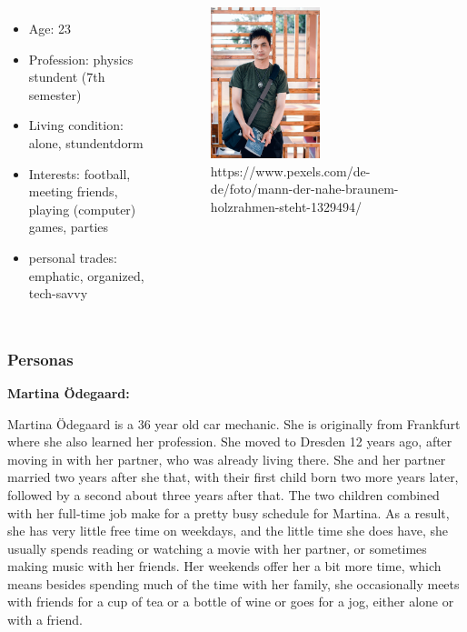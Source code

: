 \documentclass[aspectratio=169]{beamer}
\begin{document}
\begin{columns}
		\begin{itemize}
		\item Age: 23
		\item Profession: physics stundent (7th semester)
		\item Living condition: alone, stundentdorm
		\item Interests: football, meeting friends, playing (computer) games, parties
		\item personal trades: emphatic, organized, tech-savvy
	\end{itemize}
	 \begin{figure}
		 \centering
		\includegraphics[width=0.5\textwidth]{media/student.jpg}
		\caption{https://www.pexels.com/de-de/foto/mann-der-nahe-braunem-holzrahmen-steht-1329494/}
	\end{figure}
\end{columns}





\begin{frame}   
	\frametitle{Personas}{\textbf{Martina Ödegaard:}}

	Martina Ödegaard is a 36 year old car mechanic. She is originally from Frankfurt where she also learned her profession. She moved to Dresden 12 years ago, after moving in with her partner, who was already living there. She and her partner married 	two years after she that, with their first child born two more years later, followed by a second about three years after that. The two children combined with her full-time job make for a pretty busy schedule for Martina. As a result, she has very little free time on weekdays, and the little time she does have, she usually spends reading or watching a movie with her partner, or sometimes making music with her friends. Her weekends offer her a bit more time, which means besides spending much of the time with her family, she occasionally meets with friends for a cup of tea or a bottle of wine or goes for a jog, either alone or with a friend. 

\end{frame}
\end{document}
